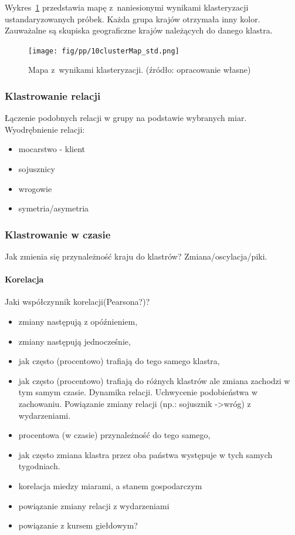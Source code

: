 \documentclass[11pt]{report}
\begin{document}
    Wykres~\ref{fig:clust10std} przedstawia mapę z~naniesionymi wynikami klasteryzacji ustandaryzowanych próbek.
    Każda grupa krajów otrzymała inny kolor.
    Zauważalne są skupiska geograficzne krajów należących do danego klastra.

    \begin{figure}[!htp]
        \centering
        \texttt{[image: fig/pp/10clusterMap\_std.png]}
        \caption{Mapa z~wynikami klasteryzacji. (źródło: opracowanie własne)}
        \label{fig:clust10std}
    \end{figure}

    \subsubsection{Klastrowanie relacji}
    Łączenie podobnych relacji w grupy na podstawie wybranych miar.
    Wyodrębnienie relacji:
    \begin{itemize}
        \item mocarstwo - klient
        \item sojusznicy
        \item wrogowie
        \item symetria/asymetria
    \end{itemize}

    \subsubsection{Klastrowanie w czasie}
    Jak zmienia się przynależność kraju do klastrów?
    Zmiana/oscylacja/piki.

    \paragraph{Korelacja}
    Jaki współczynnik korelacji(Pearsona?)?
    \begin{itemize}
        \item zmiany następują z opóźnieniem,
        \item zmiany następują jednocześnie,
        \item jak często (procentowo) trafiają do tego samego klastra,
        \item jak często (procentowo) trafiają do różnych klastrów ale zmiana zachodzi w tym samym czasie.
        Dynamika relacji.
        Uchwycenie podobieństwa w zachowaniu.
        Powiązanie zmiany relacji (np.: sojusznik ->wróg) z wydarzeniami.
        \item procentowa (w czasie) przynależność do tego samego,
        \item jak często zmiana klastra przez oba państwa występuje w tych samych tygodniach.
        \item korelacja miedzy miarami, a stanem gospodarczym
        \item powiązanie zmiany relacji z wydarzeniami
        \item powiązanie z kursem giełdowym?
    \end{itemize}
\end{document}
